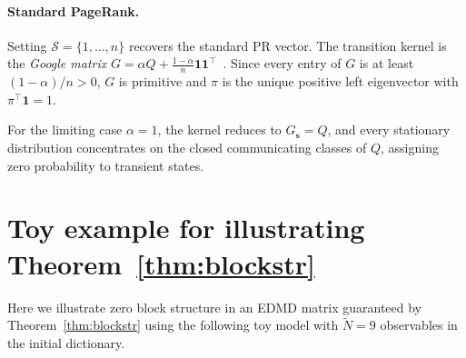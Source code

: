 \documentclass{article}
\theoremstyle{plain}
\theoremstyle{definition}
\def\tp{\intercal}
\begin{document}
\paragraph{Standard PageRank.}
Setting $\mathcal{S} = \{1,\ldots,n\}$ recovers the standard PR vector. The transition kernel is the \emph{Google matrix} $G = \alpha Q + \frac{1-\alpha}{n}\mathbf{1}\mathbf{1}^\tp$~\cite{PageRank1998}. Since every entry of $G$ is at least $(1-\alpha)/n > 0$, $G$ is primitive and ${\pi}$ is the unique positive left eigenvector with ${\pi}^\tp\mathbf{1} = 1$.

For the limiting case $\alpha = 1$, the kernel reduces to $G_{\mathbf{s}} = Q$, and every stationary distribution concentrates on the closed communicating classes of $Q$, assigning zero probability to transient states.


	\section{Toy example for illustrating Theorem~\ref{thm:blockstr}}\label{app:toy-model}
	Here we illustrate zero block structure in an EDMD matrix guaranteed by Theorem~\ref{thm:blockstr} using the following toy model with $\tilde{N} = 9$ observables in the initial dictionary.
	
\end{document}
